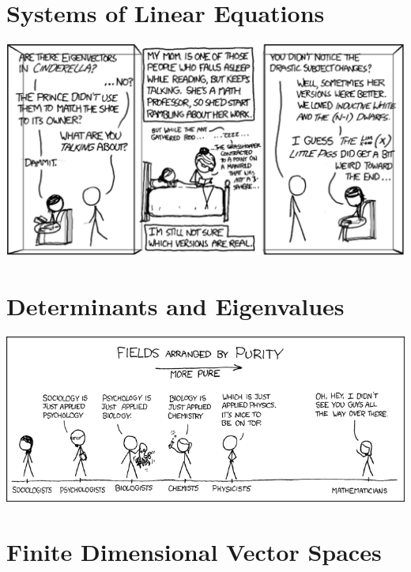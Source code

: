 \documentclass[oneside]{book}
\begin{document}
\chapter{Systems of Linear Equations} \label{chapter:syslineq}

    

\begin{savequote}
    \includegraphics[scale=0.4]{Graphics/eigenvectorxkcd.png}
\end{savequote}
\chapter{Determinants and Eigenvalues} \label{chapter:deteigen}

    

\begin{savequote}
    \includegraphics[scale=0.4]{Graphics/puremathxkcd.png}
\end{savequote}
\chapter{Finite Dimensional Vector Spaces} \label{chapter:vcspcs}
\end{document}
